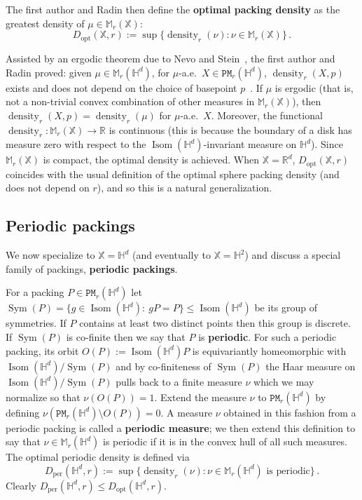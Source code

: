 \documentclass[11pt]{amsart}
\theoremstyle{definition}
\theoremstyle{remark}
\renewcommand{\H}{\mathbb{H}}
\newcommand{\R}{\mathbb{R}}
\newcommand{\M}{\mathbb{M}}
\newcommand{\bX}{\mathbb{X}}
\newcommand{\cP}{\mathtt{PM}}
\newcommand{\Isom}{\operatorname{Isom}}
\newcommand{\Sym}{\operatorname{Sym}}
\newcommand{\density}{\operatorname{density}}
\newcommand{\opt}{\operatorname{opt}}
\newcommand{\per}{\operatorname{per}}
\newcommand{\Dopt}{D_{\opt}}
\newcommand{\Dper}{D_{\per}}
\begin{document}
The first author and Radin then define the {\bf optimal packing density} as the greatest density of $\mu\in \M_r(\bX)$:
$$\Dopt(\bX,r) := \sup\{ \density_r(\nu) : \nu \in \M_r(\bX)\}\,. $$




Assisted by an ergodic theorem due to Nevo and Stein~\cite{nevo1997analogs}, the first author and Radin proved: given $\mu \in \M_r(\H^d)$, for $\mu$-a.e.\ $X \in \cP_r(\H^d)$, $\density_r(X,p)$ exists and does not depend on the choice of basepoint $p$~\cite{bowen2002densest}. If $\mu$ is ergodic (that is, not a non-trivial convex combination of other measures in $\M_r(\bX)$), then $\density_r(X,p) = \density_r(\mu)$ for $\mu$-a.e.\ $X$. Moreover, the functional $\density_r: \M_r(\bX) \to \R$ is continuous (this is because the boundary of a disk has measure zero with respect to the $\Isom(\H^d)$-invariant measure on $\H^d$). Since $\M_r(\bX)$ is compact, the optimal density is achieved.  When $\bX = \R^d$, $\Dopt(\bX,r)$ coincides with the usual definition of the optimal sphere packing density (and does not depend on $r$), and so this is a natural generalization.



\subsection{Periodic packings}

We now specialize to $\bX = \H^d$ (and eventually to $\bX = \H^2$) and discuss a special family of packings, {\bf periodic packings}.


For a packing $P \in \cP_r(\H^d)$ let $\Sym(P) =\{g\in \Isom(\H^d):~gP=P\}\leq \Isom(\H^d)$ be its group of symmetries. If $P$ contains at least two distinct points then this group is discrete.
If $\Sym(P)$ is co-finite then we say that $P$ is {\bf periodic}.  For such a periodic packing, its orbit $O(P) := \Isom(\H^d) P$ is equivariantly homeomorphic with $\Isom(\H^d) / \Sym(P)$ and by co-finiteness of $\Sym(P)$ the Haar measure on $\Isom(\H^d) / \Sym(P)$ pulls back to a finite measure $\nu$ which we may normalize so that $\nu(O(P)) = 1$.  Extend the measure $\nu$ to $\cP_r(\H^d)$ by defining $\nu(\cP_r(\H^d) \setminus O(P)) = 0$.  A measure $\nu$ obtained in this fashion from a periodic packing is called a {\bf periodic measure}; we then extend this definition to say that $\nu \in \M_r(\H^d)$ is periodic if it is in the convex hull of all such measures.    The optimal periodic density is defined via $$\Dper(\H^d,r) := \sup\{\density_r(\nu) : \nu \in \M_r(\H^d) \text{ is periodic} \}\,. $$
Clearly $\Dper(\H^d,r) \leq \Dopt(\H^d,r)$.  
\end{document}
